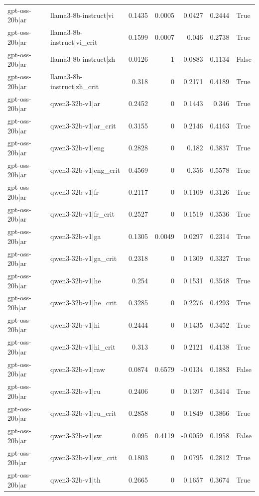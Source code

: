 \begin{table}
\begin{tabular}{l l r r r r l}
gpt-oss-20b|ar & llama3-8b-instruct|vi & 0.1435 & 0.0005 & 0.0427 & 0.2444 & True \\
gpt-oss-20b|ar & llama3-8b-instruct|vi_crit & 0.1599 & 0.0007 & 0.046 & 0.2738 & True \\
gpt-oss-20b|ar & llama3-8b-instruct|zh & 0.0126 & 1 & -0.0883 & 0.1134 & False \\
gpt-oss-20b|ar & llama3-8b-instruct|zh_crit & 0.318 & 0 & 0.2171 & 0.4189 & True \\
gpt-oss-20b|ar & qwen3-32b-v1|ar & 0.2452 & 0 & 0.1443 & 0.346 & True \\
gpt-oss-20b|ar & qwen3-32b-v1|ar_crit & 0.3155 & 0 & 0.2146 & 0.4163 & True \\
gpt-oss-20b|ar & qwen3-32b-v1|eng & 0.2828 & 0 & 0.182 & 0.3837 & True \\
gpt-oss-20b|ar & qwen3-32b-v1|eng_crit & 0.4569 & 0 & 0.356 & 0.5578 & True \\
gpt-oss-20b|ar & qwen3-32b-v1|fr & 0.2117 & 0 & 0.1109 & 0.3126 & True \\
gpt-oss-20b|ar & qwen3-32b-v1|fr_crit & 0.2527 & 0 & 0.1519 & 0.3536 & True \\
gpt-oss-20b|ar & qwen3-32b-v1|ga & 0.1305 & 0.0049 & 0.0297 & 0.2314 & True \\
gpt-oss-20b|ar & qwen3-32b-v1|ga_crit & 0.2318 & 0 & 0.1309 & 0.3327 & True \\
gpt-oss-20b|ar & qwen3-32b-v1|he & 0.254 & 0 & 0.1531 & 0.3548 & True \\
gpt-oss-20b|ar & qwen3-32b-v1|he_crit & 0.3285 & 0 & 0.2276 & 0.4293 & True \\
gpt-oss-20b|ar & qwen3-32b-v1|hi & 0.2444 & 0 & 0.1435 & 0.3452 & True \\
gpt-oss-20b|ar & qwen3-32b-v1|hi_crit & 0.313 & 0 & 0.2121 & 0.4138 & True \\
gpt-oss-20b|ar & qwen3-32b-v1|raw & 0.0874 & 0.6579 & -0.0134 & 0.1883 & False \\
gpt-oss-20b|ar & qwen3-32b-v1|ru & 0.2406 & 0 & 0.1397 & 0.3414 & True \\
gpt-oss-20b|ar & qwen3-32b-v1|ru_crit & 0.2858 & 0 & 0.1849 & 0.3866 & True \\
gpt-oss-20b|ar & qwen3-32b-v1|sw & 0.095 & 0.4119 & -0.0059 & 0.1958 & False \\
gpt-oss-20b|ar & qwen3-32b-v1|sw_crit & 0.1803 & 0 & 0.0795 & 0.2812 & True \\
gpt-oss-20b|ar & qwen3-32b-v1|th & 0.2665 & 0 & 0.1657 & 0.3674 & True \\

\end{tabular}
\end{table}
